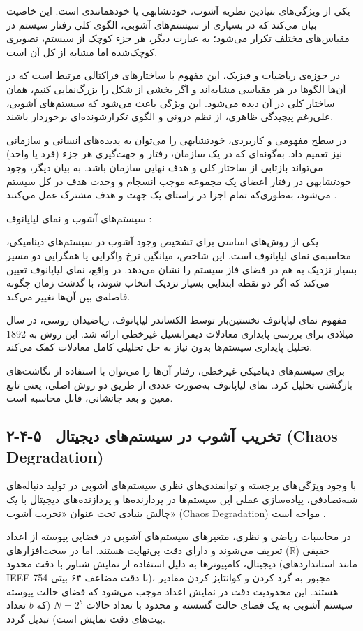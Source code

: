 یکی از ویژگی‌های بنیادین نظریه آشوب، خودتشابهی یا خودهمانندی است. این خاصیت بیان می‌کند که در بسیاری از سیستم‌های آشوبی، الگوی کلی رفتار سیستم در مقیاس‌های مختلف تکرار می‌شود؛ به عبارت دیگر، هر جزء کوچک از سیستم، تصویری کوچک‌شده اما مشابه از کل آن است.

در حوزه‌ی ریاضیات و فیزیک، این مفهوم با ساختارهای فراکتالی مرتبط است که در آن‌ها الگوها در هر مقیاسی مشابه‌اند و اگر بخشی از شکل را بزرگ‌نمایی کنیم، همان ساختار کلی در آن دیده می‌شود. این ویژگی باعث می‌شود که سیستم‌های آشوبی، علی‌رغم پیچیدگی ظاهری، از نظم درونی و الگوی تکرارشونده‌ای برخوردار باشند.

در سطح مفهومی و کاربردی، خودتشابهی را می‌توان به پدیده‌های انسانی و سازمانی نیز تعمیم داد. به‌گونه‌ای که در یک سازمان، رفتار و جهت‌گیری هر جزء (فرد یا واحد) می‌تواند بازتابی از ساختار کلی و هدف نهایی سازمان باشد. به بیان دیگر، وجود خودتشابهی در رفتار اعضای یک مجموعه موجب انسجام و وحدت هدف در کل سیستم می‌شود، به‌طوری‌که تمام اجزا در راستای یک جهت و هدف مشترک عمل می‌کنند \cite{ref27}.

سیستم‌های آشوب و نمای لیاپانوف :

یکی از روش‌های اساسی برای تشخیص وجود آشوب در سیستم‌های دینامیکی، محاسبه‌ی نمای لیاپانوف است. این شاخص، میانگین نرخ واگرایی یا همگرایی دو مسیر بسیار نزدیک به هم در فضای فاز سیستم را نشان می‌دهد. در واقع، نمای لیاپانوف تعیین می‌کند که اگر دو نقطه ابتدایی بسیار نزدیک انتخاب شوند، با گذشت زمان چگونه فاصله‌ی بین آن‌ها تغییر می‌کند.

مفهوم نمای لیاپانوف نخستین‌بار توسط الکساندر لیاپانوف، ریاضیدان روسی، در سال ‎1892‎ میلادی برای بررسی پایداری معادلات دیفرانسیل غیرخطی ارائه شد. این روش به تحلیل پایداری سیستم‌ها بدون نیاز به حل تحلیلی کامل معادلات کمک می‌کند.

برای سیستم‌های دینامیکی غیرخطی، رفتار آن‌ها را می‌توان با استفاده از نگاشت‌های بازگشتی تحلیل کرد. نمای لیاپانوف به‌صورت عددی از طریق دو روش اصلی، یعنی تابع معین و بعد جانشانی، قابل محاسبه است.

\subsection{۲-۴-۵  تخریب آشوب در سیستم‌های دیجیتال (‎Chaos Degradation‎)}

با وجود ویژگی‌های برجسته و توانمندی‌های نظری سیستم‌های آشوبی در تولید دنباله‌های شبه‌تصادفی، پیاده‌سازی عملی این سیستم‌ها در پردازنده‌ها و پردازنده‌های دیجیتال با یک چالش بنیادی تحت عنوان «تخریب آشوب» (‎Chaos Degradation‎) مواجه است \cite{ref5, ref19}. 

در محاسبات ریاضی و نظری، متغیرهای سیستم‌های آشوبی در فضایی پیوسته از اعداد حقیقی ($\mathbb{R}$) تعریف می‌شوند و دارای دقت بی‌نهایت هستند. اما در سخت‌افزارهای دیجیتال، کامپیوترها به دلیل استفاده از نمایش شناور با دقت محدود (مانند استانداردهای ‎IEEE 754‎ با دقت مضاعف ۶۴ بیتی)، مجبور به گرد کردن و کوانتایز کردن مقادیر هستند. این محدودیت دقت در نمایش اعداد موجب می‌شود که فضای حالت پیوسته سیستم آشوبی به یک فضای حالت گسسته و محدود با تعداد حالات $N=2^b$ (که $b$ تعداد بیت‌های دقت نمایش است) تبدیل گردد.

